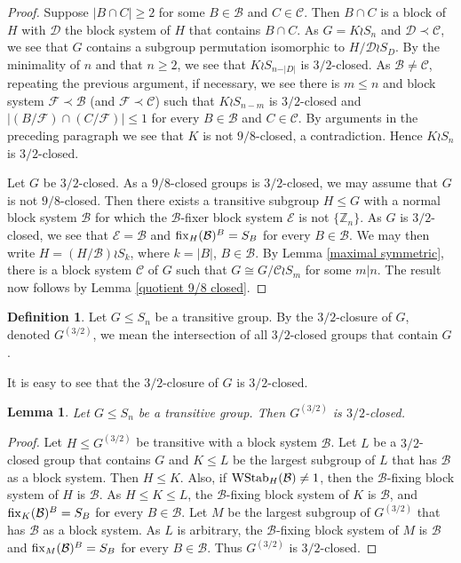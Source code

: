 \documentclass{amsart}
\newtheorem{lem}[thrm]{Lemma}
\theoremstyle{definition}
\newtheorem{definition}[thrm]{Definition}
\theoremstyle{remark}
\numberwithin{equation}{section}
\def\Z{{\mathbb Z}}
\def\fix{{\rm fix}}
\def\cal{\mathcal}
\def\WStab{{\rm WStab}}
\begin{document}
\begin{proof}
Suppose $\vert B\cap C\vert\ge 2$ for some $B\in{\cal B}$ and $C\in{\cal C}$.  Then $B\cap C$ is a block of $H$ with ${\cal D}$ the block system of $H$ that contains $B\cap C$.  As $G = K\wr S_n$ and ${\cal D}\prec{\cal C}$, we see that $G$ contains a subgroup permutation isomorphic to $H/{\cal D}\wr S_D$.  By the minimality of $n$ and that $n\ge 2$, we see that $K\wr S_{n-\vert D\vert}$ is $3/2$-closed.  As ${\cal B}\not = {\cal C}$, repeating the previous argument, if necessary, we see there is $m\le n$ and block system ${\cal F}\prec{\cal B}$ (and ${\cal F}\prec{\cal C}$) such that $K\wr S_{n-m}$ is $3/2$-closed and $\vert (B/{\cal F})\cap (C/{\cal F})\vert\le 1$ for every $B\in{\cal B}$ and $C\in{\cal C}$.  By arguments in the preceding paragraph we see that $K$ is not $9/8$-closed, a contradiction.  Hence $K\wr S_n$ is $3/2$-closed.

Let $G$ be $3/2$-closed.  As a $9/8$-closed groups is $3/2$-closed, we may assume that $G$ is not $9/8$-closed.  Then there exists a transitive subgroup $H\le G$ with a normal block system ${\cal B}$ for which the ${\cal B}$-fixer block system ${\cal E}$ is not $\{\Z_n\}$.  As $G$ is $3/2$-closed, we see that ${\cal E} = {\cal B}$ and $\fix_H({\cal B})^B = S_B$ for every $B\in{\cal B}$.  We may then write $H = (H/{\cal B})\wr S_k$, where $k = \vert B\vert$, $B\in{\cal B}$.  By Lemma \ref{maximal symmetric}, there is a block system ${\cal C}$ of $G$ such that $G\cong G/{\cal C}\wr S_m$ for some $m\vert n$.  The result now follows by Lemma \ref{quotient 9/8 closed}.
\end{proof}

\begin{definition}
Let $G\le S_n$ be a transitive group.  By the $3/2$-closure of $G$, denoted $G^{(3/2)}$, we mean the intersection of all $3/2$-closed groups that contain $G$.
\end{definition}

It is easy to see that the $3/2$-closure of $G$ is $3/2$-closed.

\begin{lem}\label{3/2 closure}
Let $G\le S_n$ be a transitive group.  Then $G^{(3/2)}$ is $3/2$-closed.
\end{lem}

\begin{proof}
Let $H\le G^{(3/2)}$ be transitive with a block system ${\cal B}$.  Let $L$ be a $3/2$-closed group that contains $G$ and $K\le L$ be the largest subgroup of $L$ that has ${\cal B}$ as a block system.  Then $H\le K$.  Also, if $\WStab_H({\cal B})\not = 1$, then the ${\cal B}$-fixing block system of $H$ is ${\cal B}$.  As $H\le K\le L$, the ${\cal B}$-fixing block system of $K$ is ${\cal B}$, and $\fix_K({\cal B})^B = S_B$ for every $B\in{\cal B}$.  Let $M$ be the largest subgroup of $G^{(3/2)}$ that has ${\cal B}$ as a block system.  As $L$ is arbitrary, the ${\cal B}$-fixing block system of $M$ is ${\cal B}$ and $\fix_M({\cal B})^B = S_B$ for every $B\in{\cal B}$.  Thus $G^{(3/2)}$ is $3/2$-closed.
\end{proof}
\end{document}
